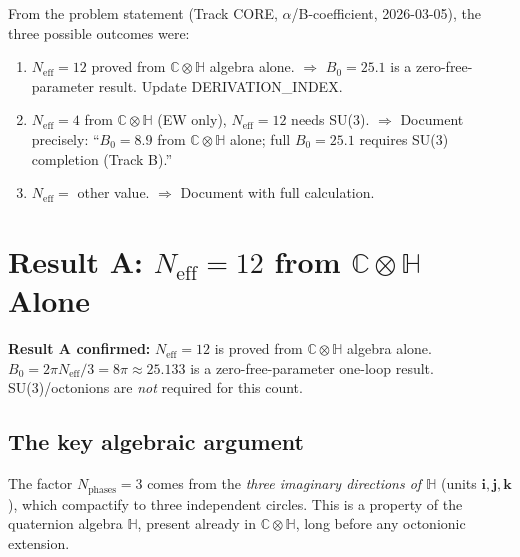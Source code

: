 \documentclass[12pt,a4paper]{article}
\theoremstyle{definition}
\theoremstyle{remark}
\newcommand{\C}{\mathbb{C}}
\renewcommand{\H}{\mathbb{H}}
\newcommand{\Neff}{N_{\mathrm{eff}}}
\begin{document}
From the problem statement (Track CORE, $\alpha$/B-coefficient, 2026-03-05),
the three possible outcomes were:

\begin{enumerate}
  \item[\textbf{A.}] $\Neff = 12$ proved from $\C \otimes \H$ algebra alone.
    $\Rightarrow$ $B_0 = 25.1$ is a zero-free-parameter result.
    Update DERIVATION\_INDEX.
  \item[\textbf{B.}] $\Neff = 4$ from $\C \otimes \H$ (EW only),
    $\Neff = 12$ needs SU(3).
    $\Rightarrow$ Document precisely: ``$B_0 = 8.9$ from $\C \otimes \H$ alone;
    full $B_0 = 25.1$ requires SU(3) completion (Track B).''
  \item[\textbf{C.}] $\Neff = $ other value.
    $\Rightarrow$ Document with full calculation.
\end{enumerate}

\section{Result A: $\Neff = 12$ from $\C \otimes \H$ Alone}
\label{sec:result_A}

\begin{center}
  \colorbox{provengreen!15}{%
    \parbox{0.88\textwidth}{%
      \large\textbf{Result A confirmed:}
      $\Neff = 12$ is proved from $\C \otimes \H$ algebra alone.\\[4pt]
      $B_0 = 2\pi\Neff/3 = 8\pi \approx 25.133$ is a zero-free-parameter
      one-loop result.\\[4pt]
      SU(3)/octonions are \emph{not} required for this count.}}
\end{center}

\subsection{The key algebraic argument}

The factor $N_\mathrm{phases} = 3$ comes from the \emph{three imaginary
directions of $\H$} (units $\mathbf{i}, \mathbf{j}, \mathbf{k}$), which
compactify to three independent circles.  This is a property of the
quaternion algebra $\H$, present already in $\C \otimes \H$, long before
any octonionic extension.
\end{document}

